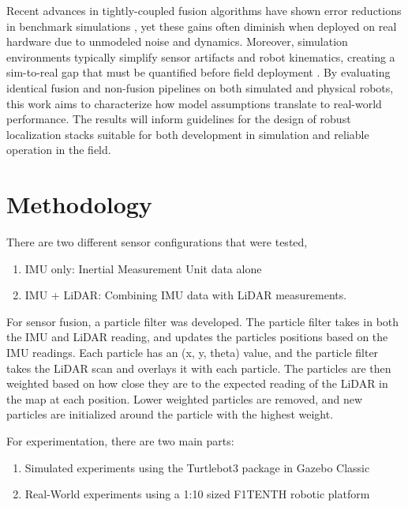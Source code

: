 \documentclass[10.5pt]{article}
\begin{document}
Recent advances in tightly-coupled fusion algorithms have shown error reductions in benchmark simulations \cite{9926435}, yet these gains often diminish when deployed on real hardware due to unmodeled noise and dynamics. Moreover, simulation environments typically simplify sensor artifacts and robot kinematics, creating a sim-to-real gap that must be quantified before field deployment \cite{abouchakra2025realissimbridgingsimtorealgap}. By evaluating identical fusion and non-fusion pipelines on both simulated and physical robots, this work aims to characterize how model assumptions translate to real-world performance. The results will inform guidelines for the design of robust localization stacks suitable for both development in simulation and reliable operation in the field.

\section{Methodology}
There are two different sensor configurations that were tested, 
\begin{enumerate}
    \item IMU only: Inertial  Measurement Unit data alone
    \item IMU + LiDAR: Combining IMU data with LiDAR measurements.
\end{enumerate}
For sensor fusion, a particle filter \cite{kunsch2013particle} was developed. The particle filter takes in both the IMU and LiDAR reading, and updates the particles positions based on the IMU readings. Each particle has an (x, y, theta) value, and the particle filter takes the LiDAR scan and overlays it with each particle. The particles are then weighted based on how close they are to the expected reading of the LiDAR in the map at each position. Lower weighted particles are removed, and new particles are initialized around the particle with the highest weight.

For experimentation, there are two main parts:
\begin{enumerate}
    \item Simulated experiments using the Turtlebot3 package in Gazebo Classic
    \item Real-World experiments using a 1:10 sized F1TENTH robotic platform \cite{f1tenth}
\end{enumerate}
\end{document}
